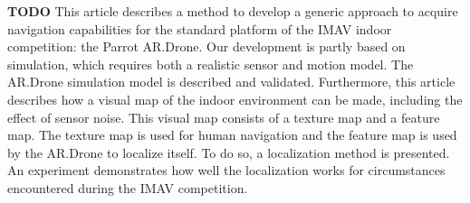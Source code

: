 \textbf{TODO}
This article describes a method to develop a generic approach to
acquire navigation capabilities for the standard platform of the IMAV indoor competition: the Parrot AR.Drone.
Our development is partly based on simulation, which requires both a realistic sensor and motion model.
The AR.Drone simulation model is described and validated.
Furthermore, this article describes how a visual map of the indoor environment can be made, including the effect of sensor noise.
This visual map consists of a texture map and a feature map. The texture map is used for human navigation and the feature map is used by the AR.Drone to localize itself.
To do so, a localization method is presented.
An experiment demonstrates how well the localization works for circumstances encountered during the IMAV competition. 
